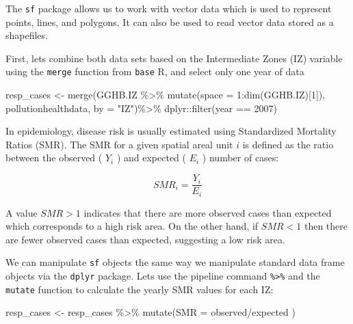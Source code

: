 \documentclass[
  letterpaper,
  DIV=11,
  numbers=noendperiod]{scrartcl}
\newenvironment{Shaded}{\begin{snugshade}}{\end{snugshade}}
\newcommand{\AttributeTok}[1]{\textcolor[rgb]{0.40,0.45,0.13}{#1}}
\newcommand{\DecValTok}[1]{\textcolor[rgb]{0.68,0.00,0.00}{#1}}
\newcommand{\FunctionTok}[1]{\textcolor[rgb]{0.28,0.35,0.67}{#1}}
\newcommand{\NormalTok}[1]{\textcolor[rgb]{0.00,0.23,0.31}{#1}}
\newcommand{\OtherTok}[1]{\textcolor[rgb]{0.00,0.23,0.31}{#1}}
\newcommand{\SpecialCharTok}[1]{\textcolor[rgb]{0.37,0.37,0.37}{#1}}
\newcommand{\StringTok}[1]{\textcolor[rgb]{0.13,0.47,0.30}{#1}}
\begin{document}
The \texttt{sf} package allows us to work with vector data which is used
to represent points, lines, and polygons. It can also be used to read
vector data stored as a shapefiles.

First, lets combine both data sets based on the Intermediate Zones (IZ)
variable using the \texttt{merge} function from \texttt{base} R, and
select only one year of data

\begin{Shaded}
\begin{Highlighting}[]
\NormalTok{resp\_cases }\OtherTok{\textless{}{-}} \FunctionTok{merge}\NormalTok{(GGHB.IZ }\SpecialCharTok{\%\textgreater{}\%}
                      \FunctionTok{mutate}\NormalTok{(}\AttributeTok{space =} \DecValTok{1}\SpecialCharTok{:}\FunctionTok{dim}\NormalTok{(GGHB.IZ)[}\DecValTok{1}\NormalTok{]),}
\NormalTok{                             pollutionhealthdata, }\AttributeTok{by =} \StringTok{"IZ"}\NormalTok{)}\SpecialCharTok{\%\textgreater{}\%}
\NormalTok{  dplyr}\SpecialCharTok{::}\FunctionTok{filter}\NormalTok{(year }\SpecialCharTok{==} \DecValTok{2007}\NormalTok{) }
\end{Highlighting}
\end{Shaded}

In epidemiology, disease risk is usually estimated using Standardized
Mortality Ratios (SMR). The SMR for a given spatial areal unit \(i\) is
defined as the ratio between the observed ( \(Y_i\) ) and expected (
\(E_i\) ) number of cases:

\[
SMR_i = \dfrac{Y_i}{E_i}
\]

A value \(SMR > 1\) indicates that there are more observed cases than
expected which corresponds to a high risk area. On the other hand, if
\(SMR<1\) then there are fewer observed cases than expected, suggesting
a low risk area.

We can manipulate \texttt{sf} objects the same way we manipulate
standard data frame objects via the \texttt{dplyr} package. Lets use the
pipeline command \texttt{\%\textgreater{}\%} and the \texttt{mutate}
function to calculate the yearly SMR values for each IZ:

\begin{Shaded}
\begin{Highlighting}[]
\NormalTok{resp\_cases }\OtherTok{\textless{}{-}}\NormalTok{ resp\_cases }\SpecialCharTok{\%\textgreater{}\%} 
  \FunctionTok{mutate}\NormalTok{(}\AttributeTok{SMR =}\NormalTok{ observed}\SpecialCharTok{/}\NormalTok{expected )}
\end{Highlighting}
\end{Shaded}
\end{document}
